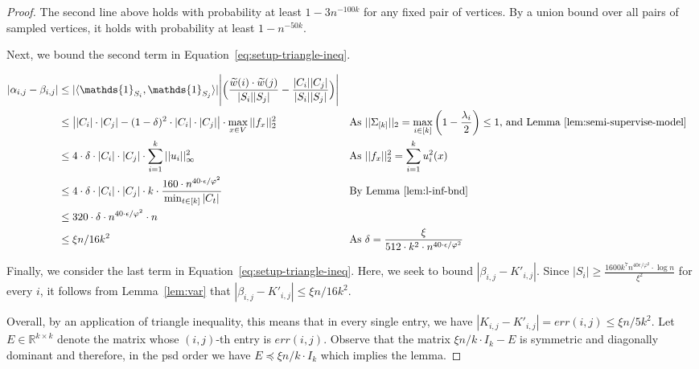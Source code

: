 \documentclass[letterpaper,11pt]{article}
\newcommand{\R}{\mathbb{R}}
\theoremstyle{plain}
\theoremstyle{definition}
\theoremstyle{remark}
\newcommand{\e}{\epsilon}
\begin{document}
\begin{proof}
The second line above holds with probability at least $1 - 3n^{-100k}$ for any fixed pair of vertices. By a union bound over all pairs of sampled vertices, it holds with probability at least $1 - n^{-50k}$.

Next, we bound the second term in Equation~\eqref{eq:setup-triangle-ineq}. 

\begin{align*}
    |\alpha_{i,j} - \beta_{i,j}| &\leq |\langle \mathds{1}_{S_i}, \mathds{1}_{S_j} \rangle| \Biggl| \Big(\frac{\widetilde w(i) \cdot \widetilde w(j)}{|S_i| |S_j|} - \frac{|C_i| |C_j|}{|S_i| |S_j|} \Big) \Biggr| \\
    &\leq \left||C_i|\cdot |C_j| - (1-\delta)^2\cdot |C_i|\cdot |C_j|\right| \cdot \max_{x\in V}||f_x||_2^2 &&\text{As $||\Sigma_{[k]}||_2=\max_{i\in [k]} \left(1-\frac{\lambda_i}{2}\right)\leq 1$, and Lemma~\ref{lem:semi-supervise-model}} \nonumber \\
&\leq 4\cdot \delta\cdot |C_i|\cdot |C_j|\cdot \sum_{i=1}^k ||u_i||^2_\infty &&\text{As $||f_x||_2^2=\sum_{i=1}^k u_i^2(x)$} \nonumber \\
&\leq 4\cdot \delta\cdot |C_i|\cdot |C_j|\cdot k\cdot \frac{160\cdot n^{40\cdot \epsilon/\varphi^2}}{\min_{t\in [k]} |C_t|} &&\text{By Lemma \ref{lem:l-inf-bnd}} \nonumber \\
&\leq 320\cdot \delta\cdot  n^{40\cdot \epsilon/\varphi^2}\cdot n \nonumber \\
&\leq \xi n/16k^2 &&\text{As $\delta=\frac{\xi}{512\cdot k^2\cdot n^{40\cdot \epsilon/\varphi^2}}$}
\end{align*}

Finally, we consider the last term in Equation~\eqref{eq:setup-triangle-ineq}. Here, we seek to bound $|\beta_{i,j} - K'_{i,j}|$. Since $|S_i| \geq \frac{1600 k^7 n^{40 \e/\varphi^2} \cdot \log n}{\xi^2}$ for every $i$, it follows from Lemma~\ref{lem:var} that $|\beta_{i,j} - K'_{i,j}| \leq \xi n/16k^2$.

Overall, by an application of triangle inequality, this means that in every single entry, we have $|K_{i,j} - K'_{i,j}| = err(i,j) \leq \xi n/5k^2$. Let $E \in \R^{k \times k}$ denote the matrix whose $(i,j)$-th entry is $err(i,j)$. Observe that the matrix $\xi n/k \cdot I_k - E$ is symmetric and diagonally dominant and therefore, in the psd order we have $E \preceq \xi n/k \cdot I_k$ which implies the lemma.

\end{proof}
\end{document}
